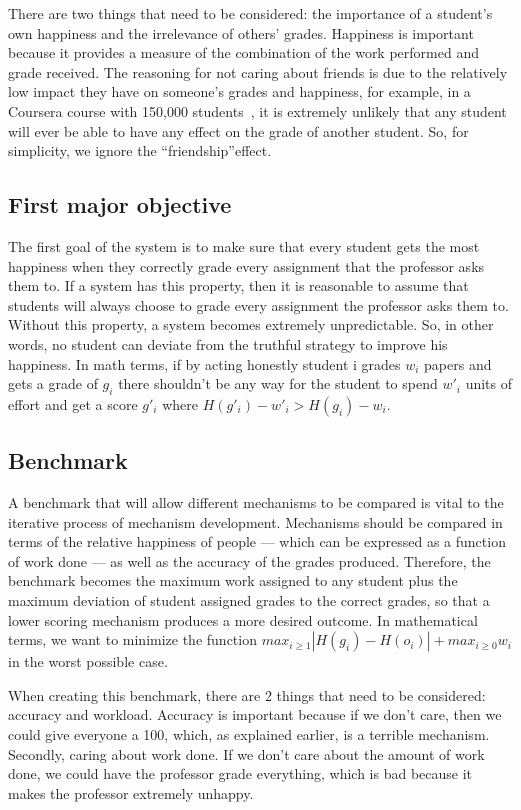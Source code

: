 \documentclass[12pt, Arial]{article}
\begin{document}
There are two things that need to be considered: the importance of a student's own happiness and the irrelevance of others' grades. Happiness is important because it provides a measure of the combination of the work performed and grade received. The reasoning for not caring about friends is due to the relatively low impact they have on someone's grades and happiness, for example, in a Coursera course with 150,000 students~\cite{swotanalysisofmoocs}, it is extremely unlikely that any student will ever be able to have any effect on the grade of another student. So, for simplicity, we ignore the ``friendship''effect.
\subsection{First major objective}
The first goal of the system is to make sure that every student gets the most happiness when they correctly grade every assignment that the professor asks them to. If a system has this property, then it is reasonable to assume that students will always choose to grade every assignment the professor asks them to. Without this property, a system becomes extremely unpredictable. So, in other words, no student can deviate from the truthful strategy to improve his happiness. In math terms, if by acting honestly student i grades $w_i$ papers and gets a grade of $g_i$ there shouldn't be any way for the student to spend $w'_i$ units of effort and get a score $g'_i$ where $H(g'_i)-w'_i > H(g_i)-w_i$.

\subsection{Benchmark}
A benchmark that will allow different mechanisms to be compared is vital to the iterative process of mechanism development. Mechanisms should be compared in terms of the relative happiness of people --- which can be expressed as a function of work done --- as well as the accuracy of the grades produced. Therefore, the benchmark becomes the maximum work assigned to any student plus the maximum deviation of student assigned grades to the correct grades, so that a lower scoring mechanism produces a more desired outcome. In mathematical terms, we want to minimize the function $max_{i \ge 1} |H(g_i)-H(o_i)| + max_{i \ge 0} w_i$ in the worst possible case.

When creating this benchmark, there are 2 things that need to be considered: accuracy and workload. Accuracy is important because if we don't care, then we could give everyone a 100, which, as explained earlier, is a terrible mechanism. Secondly, caring about work done. If we don't care about the amount of work done, we could have the professor grade everything, which is bad because it makes the professor extremely unhappy. 
\end{document}
